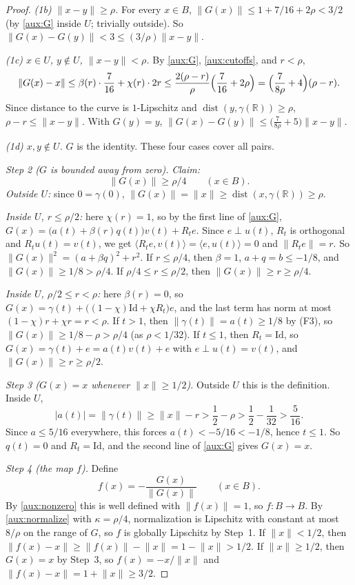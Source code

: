 \documentclass[11pt]{article}
\newcommand{\R}{\mathbb R}
\newcommand{\norm}[1]{\lVert #1\rVert}
\newcommand{\ip}[2]{\langle #1,#2\rangle}
\DeclareMathOperator{\dist}{dist}
\theoremstyle{definition}
\numberwithin{equation}{section}
\begin{document}
\begin{proof}
\emph{(1b) \(\norm{x-y}\ge\rho\).} For every \(x\in B\),
\(\norm{G(x)}\le1+7/16+2\rho<3/2\) (by \eqref{aux:G} inside \(U\);
trivially outside). So
\(\norm{G(x)-G(y)}<3\le(3/\rho)\norm{x-y}\).

\emph{(1c) \(x\in U\), \(y\notin U\), \(\norm{x-y}<\rho\).} By
\eqref{aux:G}, \eqref{aux:cutoffs}, and \(r<\rho\),
\[
 \norm{G(x)-x}\le\beta(r)\cdot\frac7{16}+\chi(r)\cdot2r
 \le\frac{2(\rho-r)}{\rho}\Bigl(\frac7{16}+2\rho\Bigr)
 =\Bigl(\frac{7}{8\rho}+4\Bigr)(\rho-r).
\]
Since distance to the curve is \(1\)-Lipschitz and
\(\dist(y,\gamma(\R))\ge\rho\), \(\rho-r\le\norm{x-y}\). With \(G(y)=y\),
\(\norm{G(x)-G(y)}\le\bigl(\tfrac7{8\rho}+5\bigr)\norm{x-y}\).

\emph{(1d) \(x,y\notin U\).} \(G\) is the identity. These four cases
cover all pairs.

\emph{Step 2 (\(G\) is bounded away from zero).} \emph{Claim:}
\begin{equation}\label{aux:nonzero}
 \norm{G(x)}\ge\rho/4\qquad(x\in B).
\end{equation}
\emph{Outside \(U\):} since \(0=\gamma(0)\),
\(\norm{G(x)}=\norm x\ge\dist(x,\gamma(\R))\ge\rho\).

\emph{Inside \(U\), \(r\le\rho/2\):} here \(\chi(r)=1\), so by the first
line of \eqref{aux:G},
\(G(x)=\bigl(a(t)+\beta(r)q(t)\bigr)v(t)+R_te\). Since \(e\perp u(t)\),
\(R_t\) is orthogonal and \(R_tu(t)=v(t)\), we get
\(\ip{R_te}{v(t)}=\ip e{u(t)}=0\) and \(\norm{R_te}=r\). So
\(\norm{G(x)}^2=(a+\beta q)^2+r^2\). If \(r\le\rho/4\), then \(\beta=1\),
\(a+q=b\le-1/8\), and \(\norm{G(x)}\ge1/8>\rho/4\). If
\(\rho/4\le r\le\rho/2\), then \(\norm{G(x)}\ge r\ge\rho/4\).

\emph{Inside \(U\), \(\rho/2\le r<\rho\):} here \(\beta(r)=0\), so
\(G(x)=\gamma(t)+\bigl((1-\chi)\mathrm{Id}+\chi R_t\bigr)e\), and the
last term has norm at most \((1-\chi)r+\chi r=r<\rho\). If \(t>1\), then
\(\norm{\gamma(t)}=a(t)\ge1/8\) by (F3), so
\(\norm{G(x)}\ge1/8-\rho>\rho/4\) (as \(\rho<1/32\)). If \(t\le1\), then
\(R_t=\mathrm{Id}\), so \(G(x)=\gamma(t)+e=a(t)v(t)+e\) with
\(e\perp u(t)=v(t)\), and \(\norm{G(x)}\ge r\ge\rho/2\).

\emph{Step 3 (\(G(x)=x\) whenever \(\norm x\ge1/2\)).} Outside \(U\) this
is the definition. Inside \(U\),
\[
 |a(t)|=\norm{\gamma(t)}\ge\norm x-r>\frac12-\rho>\frac12-\frac1{32}
 >\frac5{16}.
\]
Since \(a\le5/16\) everywhere, this forces \(a(t)<-5/16<-1/8\), hence
\(t\le1\). So \(q(t)=0\) and \(R_t=\mathrm{Id}\), and the second line of
\eqref{aux:G} gives \(G(x)=x\).

\emph{Step 4 (the map \(f\)).} Define
\[
 f(x)=-\frac{G(x)}{\norm{G(x)}}\qquad(x\in B).
\]
By \eqref{aux:nonzero} this is well defined with \(\norm{f(x)}=1\), so
\(f:B\to B\). By \eqref{aux:normalize} with \(\kappa=\rho/4\),
normalization is Lipschitz with constant at most \(8/\rho\) on the range
of \(G\), so \(f\) is globally Lipschitz by Step~1. If \(\norm x<1/2\),
then \(\norm{f(x)-x}\ge\norm{f(x)}-\norm x=1-\norm x>1/2\). If
\(\norm x\ge1/2\), then \(G(x)=x\) by Step~3, so \(f(x)=-x/\norm x\) and
\(\norm{f(x)-x}=1+\norm x\ge3/2\).
\end{proof}
\end{document}
